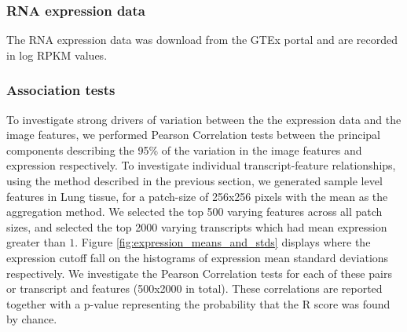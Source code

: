 \documentclass[graybox]{svmult}
\newcommand*{\figuretitle}[1]{%
    {\centering%
    \textbf{#1}%
    \par\medskip}%
}
\begin{document}
\subsubsection{RNA expression data}

The RNA expression data was download from the GTEx portal and are recorded in log RPKM values.

\subsubsection{Association tests}

To investigate strong drivers of variation between the the expression data and the image features, we performed Pearson Correlation tests between the principal components describing the 95\% of the variation in the image features and expression respectively. To investigate individual transcript-feature relationships, using the method described in the previous section, we generated sample level features in Lung tissue, for a patch-size of 256x256 pixels with the mean as the aggregation method. We selected the top 500 varying features across all patch sizes, and selected the top 2000 varying transcripts which had mean expression greater than $1$. Figure \ref{fig:expression_means_and_stds} displays where the expression cutoff fall on the histograms of expression mean standard deviations respectively. We investigate the Pearson Correlation tests for each of these pairs or transcript and features (500x2000 in total). These correlations are reported together with a p-value representing the probability that the R score was found by chance.

%
%
%    
%
%
%
%
%
\end{document}
